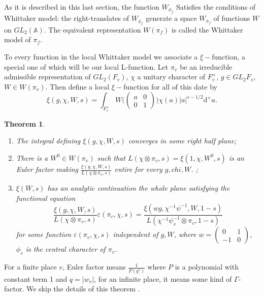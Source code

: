 \documentclass[12pt,a4paper,english]{article}
\theoremstyle{plain}
\newtheorem{thm}{Theorem}[section]
\theoremstyle{definition}
\begin{document}
As it is described in this last section, the function $W_{\phi_{f}}$ Satisfies the conditions of Whittaker model: the right-translates of $W_{\phi_{f}}$ generate a space $W_{\pi_{f}}$ of functions $W$ on $GL_{2}(\mathbb{\mathbb{A}})$. The equivalent representation $W(\pi_{f})$ is called the Whittaker model of $\pi_{f}$.

To every function in the local Whittaker model we associate a $\xi-$function, a special one of which will be our local L-function. Let $\pi_{v}$ be an irreducible admissible representation of $GL_{2}(F_{v})$, $\chi$ a unitary character of $F^{\times}_{v}$, $g\in GL_{2}F_{v}$, $W\in W(\pi_{v})$. Then define a local $\xi-$function for all of this date by
\begin{equation*}
    \xi(g,\chi,W,s)=\int_{F^{\times}_{v}}W\bigg(\begin{pmatrix}
    a&0\\
    0&1
    \end{pmatrix}\bigg)\chi(a)|a|^{s-1/2}\text{d}^{\times}a.
\end{equation*}
\begin{thm}
\begin{enumerate}
    \item The integral defining $\xi(g,\chi,W,s)$ converges in some right half plane;
    \item There is a $W^{0}\in W(\pi_{v})$ such that $L(\chi\otimes \pi_{v},s)=\xi(1,\chi,W^{0},s)$ is an Euler factor making $\frac{\xi(g,\chi,W,s)}{L(\chi\otimes\pi_{v},s)}$ entire for every $g, chi, W$. ;
    \item $\xi(W,s)$ has an analytic continuation the whole plane satisfying the functional equation
    \begin{equation*}
        \frac{\xi(g,\chi,W,s)}{L(\chi\otimes\pi_{v},s)}\varepsilon(\pi_{v},\chi,s)=\frac{\xi(wg,\chi^{-1}\psi^{-1},W,1-s)}{L(\chi^{-1}\psi_{v}^{-1}\otimes\pi_{v},1-s)}
    \end{equation*}
    for some function $\varepsilon(\pi_{v},\chi,s)$ independent of $g, W$, where $w=\begin{pmatrix}
    0&1\\
    -1&0
    \end{pmatrix}$, $\phi_{v}$ is the central character of $\pi_{v}$.
\end{enumerate}
\end{thm}
For a finite place $v$, Euler factor means $\frac{1}{P(q^{s})}$ where $P$ is a polynomial with constant term 1 and $q=|w_{v}|$, for an infinite place, it means some kind of $\Gamma$-factor. We skip the details of this theorem \cite{gelbart2016automorphic}. 
\end{document}
